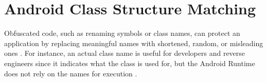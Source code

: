 \section{Android Class Structure Matching}
\label{sec:related_work:class_matching}
Obfuscated code, such as renaming symbols or class names, can protect an application by replacing meaningful names with shortened, random, or misleading ones \cite{android_matching}. For instance, an actual class name is useful for developers and reverse engineers since it indicates what the class is used for, but the Android Runtime does not rely on the names for execution \cite{android_matching}.

